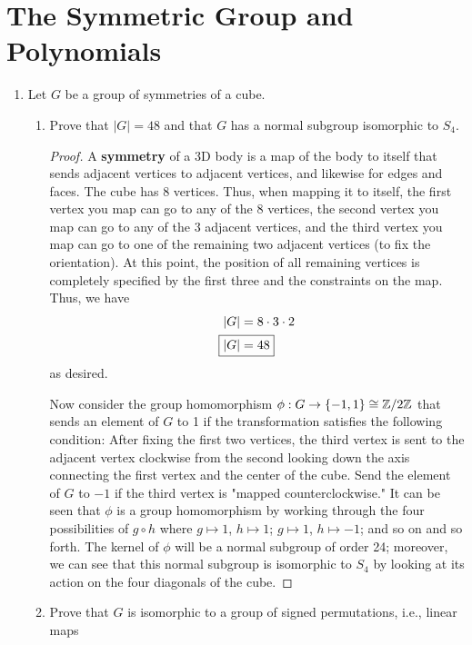 \documentclass[../psets.tex]{subfiles}
\begin{document}
\section{The Symmetric Group and Polynomials}
\begin{enumerate}
    \item {}Let $G$ be a group of symmetries of a cube.
    \begin{enumerate}
        \item Prove that $|G|=48$ and that $G$ has a normal subgroup isomorphic to $S_4$.
        \begin{proof}
            A \textbf{symmetry} of a 3D body is a map of the body to itself that sends adjacent vertices to adjacent vertices, and likewise for edges and faces. The cube has 8 vertices. Thus, when mapping it to itself, the first vertex you map can go to any of the 8 vertices, the second vertex you map can go to any of the 3 adjacent vertices, and the third vertex you map can go to one of the remaining two adjacent vertices (to fix the orientation). At this point, the position of all remaining vertices is completely specified by the first three and the constraints on the map. Thus, we have
            \begin{align*}
                |G| &= 8\cdot 3\cdot 2\\
                \Aboxed{|G| &= 48}
            \end{align*}
            as desired.\par
            Now consider the group homomorphism $\phi:G\to\{-1,1\}\cong\mathbb{Z}/2\mathbb{Z}$ that sends an element of $G$ to 1 if the transformation satisfies the following condition: After fixing the first two vertices, the third vertex is sent to the adjacent vertex clockwise from the second looking down the axis connecting the first vertex and the center of the cube. Send the element of $G$ to $-1$ if the third vertex is "mapped counterclockwise." It can be seen that $\phi$ is a group homomorphism by working through the four possibilities of $g\circ h$ where $g\mapsto 1$, $h\mapsto 1$; $g\mapsto 1$, $h\mapsto -1$; and so on and so forth. The kernel of $\phi$ will be a normal subgroup of order 24; moreover, we can see that this normal subgroup is isomorphic to $S_4$ by looking at its action on the four diagonals of the cube.
        \end{proof}
        \item Prove that $G$ is isomorphic to a group of signed permutations, i.e., linear maps
        \begin{equation*}

\end{equation*}
\end{enumerate}
\end{enumerate}
\end{document}
